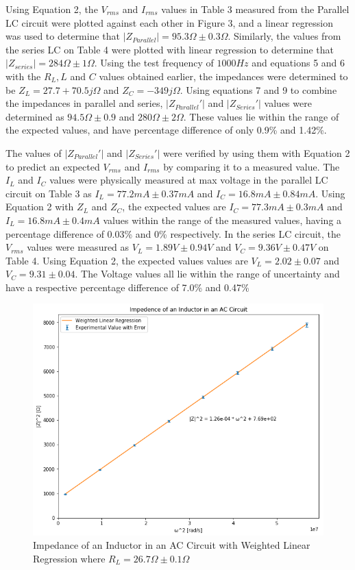 \documentclass[]{article}
\newcommand{\getMeasuredR}{$R_{L} = 26.7 \Omega \pm 0.1 \Omega $}
\begin{document}
Using Equation 2, the $V_{rms}$ and $I_{rms}$ values in Table 3 measured from
the Parallel LC circuit were plotted against each other in Figure 3, and a
linear regression was used to determine that $|Z_{Parallel}| = 95.3 \Omega \pm
0.3 \Omega$. Similarly, the values from the series LC on Table 4 were plotted
with linear regression to determine that $|Z_{series}| = 284 \Omega \pm 1
\Omega$. Using the test frequency of $1000 Hz$ and equations 5 and 6 with the
$R_L, L$ and $C$ values obtained earlier, the impedances were determined to be
$Z_L = 27.7 + 70.5j \Omega$ and $Z_C = -349j \Omega$. Using equations 7 and 9 to
combine the impedances in parallel and series, $|Z_{Parallel}'|$ and
$|Z_{Series}'|$ values were determined as $94.5 \Omega \pm 0.9 $ and $280 \Omega
\pm 2 \Omega$.  These values lie within the range of the expected values, and
have percentage difference of only 0.9\% and 1.42\%.

The values of $|Z_{Parallel}'|$ and  $|Z_{Series}'|$ were verified by using them
with Equation 2 to predict an expected $V_{rms}$ and $I_{rms}$ by comparing it
to a measured value. The $I_L$ and $I_C$ values were physically measured at max
voltage in the parallel LC circuit on Table 3 as $I_L = 77.2 mA \pm 0.37 mA$ and
$I_C = 16.8 mA \pm 0.84 mA $. Using Equation 2 with $Z_L$ and $Z_C$, the
expected values are $I_C = 77.3 mA \pm 0.3 mA$ and $I_L = 16.8 mA \pm 0.4 mA$
values within the range of the measured values, having a percentage difference
of 0.03\% and 0\% respectively. In the series LC circuit, the $V_{rms}$ values
were measured as $V_L = 1.89 V \pm 0.94 V$ and $V_C = 9.36 V \pm 0.47 V$ on
Table 4.  Using Equation 2, the expected values values are $V_L = 2.02 \pm 0.07$
and $V_C = 9.31 \pm 0.04$. The Voltage values all lie within the range of
uncertainty and have a respective percentage difference of 7.0\% and 0.47\%

\newpage
\begin{figure}[H]
    \includegraphics[width=\textwidth]{ind.png}
    \caption{Impedance of an Inductor in an AC Circuit with Weighted Linear
    Regression where \getMeasuredR}\label{fig:ind}
\end{figure}
\end{document}
